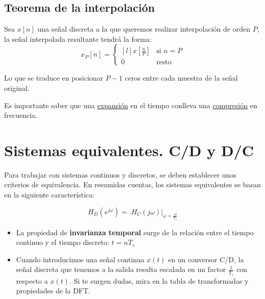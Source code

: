 \documentclass[a4paper,oneside]{book}
\begin{document}
\subsection{Teorema de la interpolación}

Sea $x[n]$ una señal discreta a la que queremos realizar interpolación de orden $P$, la señal interpolada resultante tendrá la forma:
\[ x_P[n] = \left\lbrace 
\begin{matrix*}[l]
	x \left[ \frac{n}{P} \right] & \text{si } n = \dot{P}\\[5pt]
	0 & \text{resto}
\end{matrix*} \right.\]

Lo que se traduce en posicionar $P-1$ ceros entre cada muestra de la señal original.

Es importante saber que una \underline{expansión} en el tiempo conlleva una \underline{compresión} en frecuencia.

\section{Sistemas equivalentes. C/D y D/C}

Para trabajar con sistemas continuos y discretos, se deben establecer unos criterios de equivalencia. En resumidas cuentas, los sistemas equivalentes se basan en la siguiente característica:

\[ H_D \left( e^{j\omega } \right) = \biggl. H_C \left( j\omega \right)  \biggr\vert _{\omega = \frac{\Omega}{T_s}} \]

\begin{itemize}
	\item La propiedad de \textbf{invarianza temporal} surge de la relación entre el tiempo continuo y el tiempo discreto: $t = nT_s $
	\item Cuando introducimos una señal continua $x(t)$ en un conversor C/D, la señal discreta que tenemos a la salida resulta escalada en un factor $\frac{1}{T_s}$ con respecto a $x(t)$. Si te surgen dudas, mira en la tabla de transformadas y propiedades de la DFT.
\end{itemize}
\end{document}
